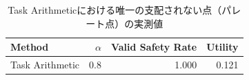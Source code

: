 \begin{table}[H]
\centering
\caption{Task Arithmeticにおける唯一の支配されない点（パレート点）の実測値}
\label{tab:task-arithmetic-single-point}
\small
\begin{tabular}{lrrr}
\toprule
Method & \(\alpha\) & Valid Safety Rate & Utility \\
\midrule
Task Arithmetic & 0.8 & 1.000 & 0.121 \\
\bottomrule
\end{tabular}
\end{table}